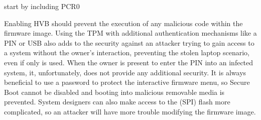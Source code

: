 start by including PCR0

Enabling \ac{HVB} should prevent the execution of any malicious code within the firmware image.
Using the \ac{TPM} with additional authentication mechanisms like a \ac{PIN} or \ac{USB} also adds to the security against an attacker trying to gain access to a system without the owner's interaction, preventing the stolen laptop scenario, even if only \hyperref[tab:pcr-usage]{} is used.
When the owner is present to enter the \ac{PIN} into an infected system, it, unfortunately, does not provide any additional security.
It is always beneficial to use a password to protect the interactive firmware menu, so Secure Boot cannot be disabled and booting into malicious removable media is prevented.
System designers can also make access to the (\ac{SPI}) flash more complicated, so an attacker will have more trouble modifying the firmware image.